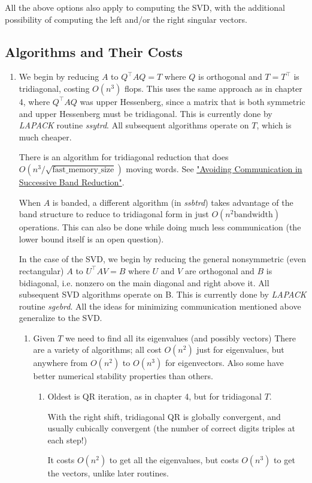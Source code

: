 \documentclass[11pt]{article}
\numberwithin{equation}{section}
\begin{document}
All the above options also apply to computing the SVD, with the additional possibility of computing the left and/or the right singular vectors.

\subsection{Algorithms and Their Costs}
\begin{enumerate}
    \item  We begin by reducing $A$ to $Q^\top AQ = T$ where $Q$ is orthogonal and $T=T^\top$ is tridiagonal, costing $O(n^3)$ flops. 
    This uses the same approach as in chapter 4, where $Q^\top AQ$ was upper Hessenberg, since a matrix that is both symmetric and upper Hessenberg must be tridiagonal. 
    This is currently done by \textit{LAPACK} routine \textit{ssytrd}. All subsequent algorithms operate on $T$, which is much cheaper.

    There is an algorithm for tridiagonal reduction that does $O(n^3 / \sqrt{\text{fast\_memory\_size}})$ moving words.
    See \href{https://dl.acm.org/doi/abs/10.1145/2686877}{"Avoiding Communication in Successive Band Reduction"}.

    When $A$ is banded, a different algorithm (in \textit{ssbtrd}) takes advantage of the band structure to reduce to tridiagonal form in just $O(n^2 \text{bandwidth})$ operations.
    This can also be done while doing much less communication (the lower bound itself is an open question).

    In the case of the SVD, we begin by reducing the general nonsymmetric (even rectangular) $A$ to $U^\top AV = B$ where $U$ and $V$ are orthogonal and $B$ is bidiagonal,
    i.e. nonzero on the main diagonal and right above it. All subsequent SVD algorithms operate on B. This is currently done by
    \textit{LAPACK} routine \textit{sgebrd}. All the ideas for minimizing communication mentioned above generalize to the SVD.

    \begin{enumerate}
        \item Given $T$ we need to find all its eigenvalues (and possibly vectors) There are a variety of algorithms; all cost $O(n^2)$ just for eigenvalues,
        but anywhere from $O(n^2)$ to $O(n^3)$ for eigenvectors. Also some have better numerical stability properties than others.
        \begin{enumerate}
            \item  Oldest is QR iteration, as in chapter 4, but for tridiagonal $T$.
            \begin{theorem}
                With the right shift, tridiagonal QR is globally convergent, and usually cubically convergent (the number of correct digits triples at each step!)
            \end{theorem}
            It costs $O(n^2)$ to get all the eigenvalues, but costs $O(n^3)$ to
            get the vectors, unlike later routines.


\end{enumerate}
\end{enumerate}
\end{enumerate}
\end{document}
